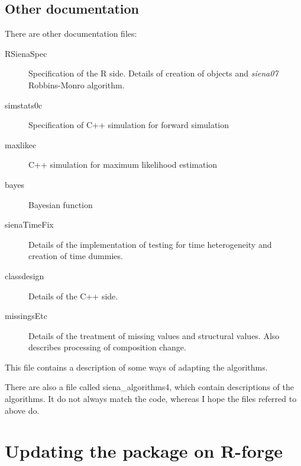 \documentclass[12pt, a4paper]{article}
\renewcommand{\=}{\,=\,}
\newcommand{\+}{\,+\,}
\newcommand{\nnm}[1]{\textsf{\small\textit{#1}}}
\begin{document}
\subsection{Other documentation}
\label{S_otherDoc}
There are other documentation files:
\begin{description}
\item[RSienaSpec] Specification of the R side.  Details of creation of objects
  and \nnm{siena07} Robbins-Monro algorithm.
\item[simstats0c] Specification of C++ simulation for forward simulation
\item[maxlikec] C++ simulation for maximum likelihood estimation
\item[bayes] Bayesian function
\item[sienaTimeFix] Details of the implementation of testing for time
  heterogeneity and creation of time dummies.
\item[classdesign] Details of the C++ side.
\item[missingsEtc] Details of the treatment of missing values and structural
  values. Also describes processing of composition change.
\end{description}
This file contains a description of some ways of adapting the algorithms.

There are also a file called siena\_algorithms4,
which contain descriptions of the algorithms. It do not always match the
code, whereas I hope the files referred to above do.
\section{Updating the package on R-forge}
\end{document}
